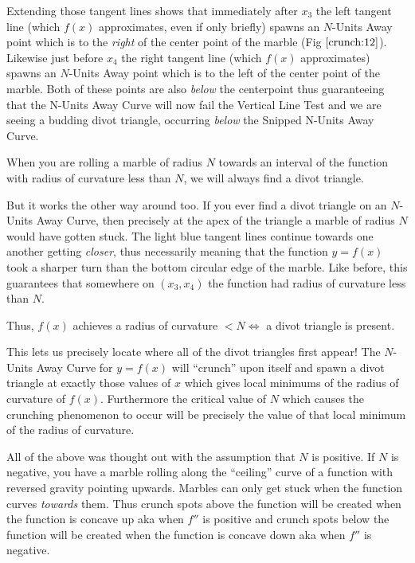 \figuresIV

Extending those tangent lines shows that immediately after $x_3$ the left tangent line (which $f(x)$ approximates, even if only briefly) spawns an $N$-Units Away point which is to the \textit{right} of the center point of the marble (Fig $\ref{crunch:12}$). Likewise just before $x_4$ the right tangent line (which $f(x)$ approximates) spawns an $N$-Units Away point which is to the left of the center point of the marble. Both of these points are also \textit{below} the centerpoint thus guaranteeing that the N-Units Away Curve will now fail the Vertical Line Test and we are seeing a budding divot triangle, occurring \textit{below} the Snipped N-Units Away Curve.

When you are rolling a marble of radius $N$ towards an interval of the function with radius of curvature less than $N$, we will always find a divot triangle.

But it works the other way around too. If you ever find a divot triangle on an $N$-Units Away Curve, then precisely at the apex of the triangle a marble of radius $N$ would have gotten stuck. The light blue tangent lines continue towards one another getting \textit{closer}, thus necessarily meaning that the function $y = f(x)$ took a sharper turn than the bottom circular edge of the marble. Like before, this guarantees that somewhere on $(x_3, x_4)$ the function had radius of curvature less than $N$.

Thus, $f(x)$ achieves a radius of curvature $ < N \iff $ a divot triangle is present.

This lets us precisely locate where all of the divot triangles first appear! The $N$-Units Away Curve for $y = f(x)$ will ``crunch'' upon itself and spawn a divot triangle at exactly those values of $x$ which gives local minimums of the radius of curvature of $f(x)$. Furthermore the critical value of $N$ which causes the crunching phenomenon to occur will be precisely the value of that local minimum of the radius of curvature.

All of the above was thought out with the assumption that $N$ is positive. If $N$ is negative, you have a marble rolling along the ``ceiling'' curve of a function with reversed gravity pointing upwards. Marbles can only get stuck when the function curves \textit{towards} them. Thus crunch spots above the function will be created when the function is concave up aka when $f''$ is positive and crunch spots below the function will be created when the function is concave down aka when $f''$ is negative.

